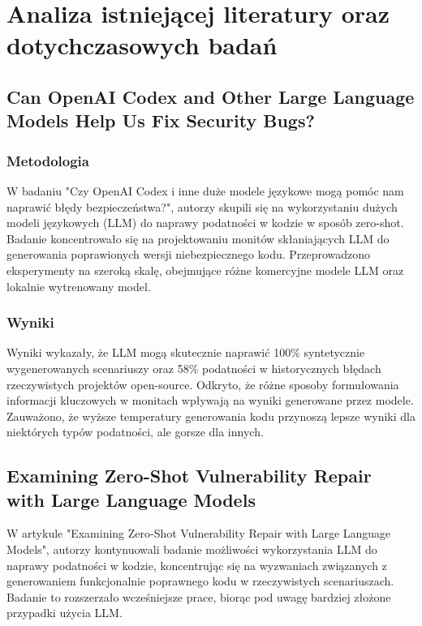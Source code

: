 
\chapter{Analiza istniejącej literatury oraz dotychczasowych badań}

\section{Can OpenAI Codex and Other Large Language Models Help Us Fix Security Bugs?}

\subsection{Metodologia}
W badaniu "Czy OpenAI Codex i inne duże modele językowe mogą pomóc nam naprawić błędy bezpieczeństwa?", autorzy skupili się na wykorzystaniu dużych modeli językowych (LLM) do naprawy podatności w kodzie w sposób zero-shot. Badanie koncentrowało się na projektowaniu monitów skłaniających LLM do generowania poprawionych wersji niebezpiecznego kodu. Przeprowadzono eksperymenty na szeroką skalę, obejmujące różne komercyjne modele LLM oraz lokalnie wytrenowany model.

\subsection{Wyniki}
Wyniki wykazały, że LLM mogą skutecznie naprawić 100\% syntetycznie wygenerowanych scenariuszy oraz 58\% podatności w historycznych błędach rzeczywistych projektów open-source. Odkryto, że różne sposoby formułowania informacji kluczowych w monitach wpływają na wyniki generowane przez modele. Zauważono, że wyższe temperatury generowania kodu przynoszą lepsze wyniki dla niektórych typów podatności, ale gorsze dla innych.

\section{Examining Zero-Shot Vulnerability Repair with Large Language Models}

W artykule "Examining Zero-Shot Vulnerability Repair with Large Language Models", autorzy kontynuowali badanie możliwości wykorzystania LLM do naprawy podatności w kodzie, koncentrując się na wyzwaniach związanych z generowaniem funkcjonalnie poprawnego kodu w rzeczywistych scenariuszach. Badanie to rozszerzało wcześniejsze prace, biorąc pod uwagę bardziej złożone przypadki użycia LLM.

